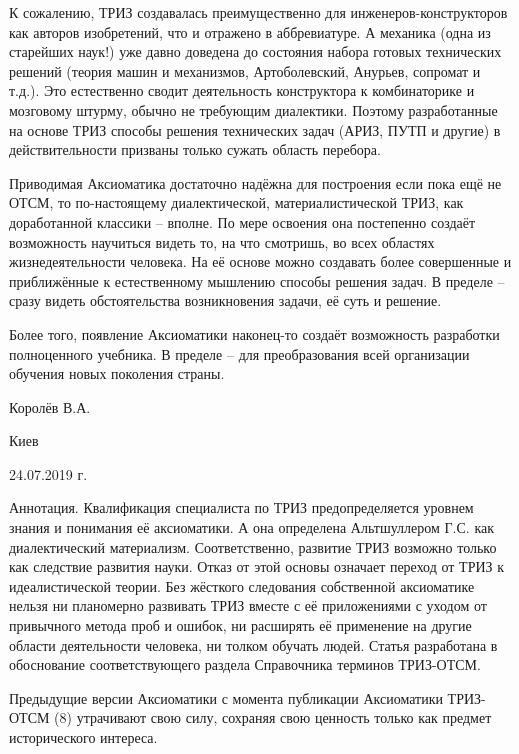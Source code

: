 \documentclass[11pt,a4paper]{article}
\begin{document}
К сожалению, ТРИЗ создавалась преимущественно для инженеров-конструкторов как авторов изобретений, что и отражено в аббревиатуре. А механика (одна из старейших наук!) уже давно доведена до состояния набора готовых технических решений (теория машин и механизмов, Артоболевский, Анурьев, сопромат и т.д.). Это естественно сводит деятельность конструктора к комбинаторике и мозговому штурму, обычно не требующим диалектики. Поэтому разработанные на основе ТРИЗ способы решения технических задач (АРИЗ, ПУТП и другие) в действительности призваны только сужать область перебора.

Приводимая Аксиоматика достаточно надёжна для построения если пока ещё не ОТСМ, то по-настоящему диалектической, материалистической ТРИЗ, как доработанной классики – вполне. По мере освоения она постепенно создаёт возможность научиться видеть то, на что смотришь, во всех областях жизнедеятельности человека. На её основе можно создавать более совершенные и приближённые к естественному мышлению способы решения задач. В пределе – сразу видеть обстоятельства возникновения задачи, её суть и решение.

Более того, появление Аксиоматики наконец-то создаёт возможность разработки полноценного учебника. В пределе – для преобразования всей организации обучения новых поколения страны.

 

 

Королёв В.А.

Киев

24.07.2019 г.

 

Аннотация. Квалификация специалиста по ТРИЗ предопределяется уровнем знания и понимания её аксиоматики. А она определена Альтшуллером Г.С. как диалектический материализм. Соответственно, развитие ТРИЗ возможно только как следствие развития науки. Отказ от этой основы означает переход от ТРИЗ к идеалистической теории. Без жёсткого следования собственной аксиоматике нельзя ни планомерно развивать ТРИЗ вместе с её приложениями с уходом от привычного метода проб и ошибок, ни расширять её применение на другие области деятельности человека, ни толком обучать людей. Статья разработана в обоснование соответствующего раздела Справочника терминов ТРИЗ-ОТСМ.

Предыдущие версии Аксиоматики с момента публикации Аксиоматики ТРИЗ-ОТСМ (8) утрачивают свою силу, сохраняя свою ценность только как предмет исторического интереса.

 
\end{document}
